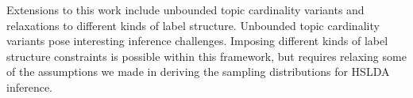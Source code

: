 

Extensions to this work include unbounded topic cardinality variants and
relaxations to different kinds of label structure.  Unbounded topic cardinality
variants pose interesting inference challenges.  Imposing different kinds of
label structure constraints is possible within this framework, but requires relaxing some
of the assumptions we made in deriving the sampling distributions for HSLDA inference.


